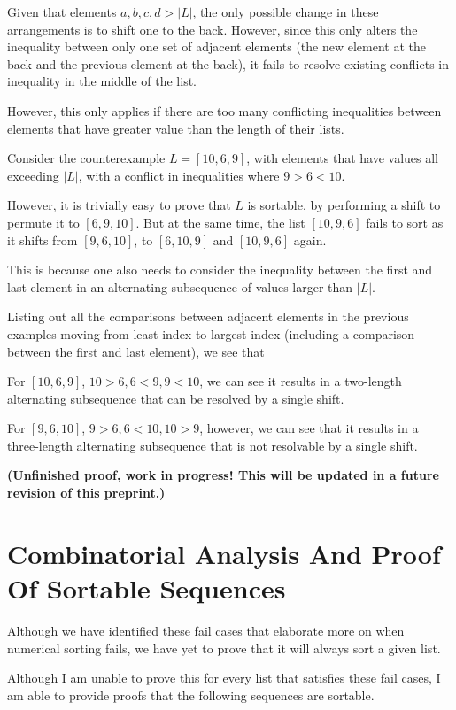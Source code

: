 \documentclass[12pt]{article}
\begin{document}
Given that elements $a, b, c, d > |L|$, the only possible change in these arrangements is to shift one to the back. However, since this only alters the inequality between only one set of adjacent elements (the new element at the back and the previous element at the back), it fails to resolve existing conflicts in inequality in the middle of the list.

However, this only applies if there are too many conflicting inequalities between elements that have greater value than the length of their lists.

Consider the counterexample $L = [10, 6, 9]$, with elements that have values all exceeding $|L|$, with a conflict in inequalities where $9 > 6 < 10$.

However, it is trivially easy to prove that $L$ is sortable, by performing a shift to permute it to $[6, 9, 10]$. But at the same time, the list $[10, 9, 6]$ fails to sort as it shifts from $[9, 6, 10]$, to $[6, 10, 9]$ and $[10, 9, 6]$ again.

This is because one also needs to consider the inequality between the first and last element in an alternating subsequence of values larger than $|L|$.

Listing out all the comparisons between adjacent elements in the previous examples moving from least index to largest index (including a comparison between the first and last element), we see that

For $[10, 6, 9]$, $10 > 6, 6 < 9, 9 < 10$, we can see it results in a two-length alternating subsequence that can be resolved by a single shift.

For $[9, 6, 10]$, $9 > 6, 6 < 10, 10 > 9$, however, we can see that it results in a three-length alternating subsequence that is not resolvable by a single shift.

\textbf{(Unfinished proof, work in progress! This will be updated in a future revision of this preprint.)}

\section{Combinatorial Analysis And Proof Of Sortable Sequences}
Although we have identified these fail cases that elaborate more on when numerical sorting fails, we have yet to prove that it will always sort a given list.

Although I am unable to prove this for every list that satisfies these fail cases, I am able to provide proofs that the following sequences are sortable.
\end{document}
